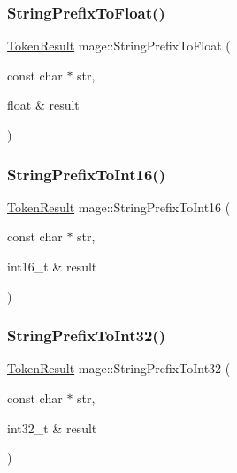 \hypertarget{namespacemage_a760872d7402dea494afc7e402c7b38da}{}\label{namespacemage_a760872d7402dea494afc7e402c7b38da} 
\subsubsection{\texorpdfstring{String\+Prefix\+To\+Float()}{StringPrefixToFloat()}}
{\footnotesize\ttfamily \hyperlink{namespacemage_a2178ba2411db5912f41b2e7698c2037d}{Token\+Result} mage\+::\+String\+Prefix\+To\+Float (\begin{DoxyParamCaption}\item[{const char $\ast$}]{str,  }\item[{float \&}]{result }\end{DoxyParamCaption})}

\hypertarget{namespacemage_a8ad9257753f5f5288f8e09b2c99e544e}{}\label{namespacemage_a8ad9257753f5f5288f8e09b2c99e544e} 
\subsubsection{\texorpdfstring{String\+Prefix\+To\+Int16()}{StringPrefixToInt16()}}
{\footnotesize\ttfamily \hyperlink{namespacemage_a2178ba2411db5912f41b2e7698c2037d}{Token\+Result} mage\+::\+String\+Prefix\+To\+Int16 (\begin{DoxyParamCaption}\item[{const char $\ast$}]{str,  }\item[{int16\+\_\+t \&}]{result }\end{DoxyParamCaption})}

\hypertarget{namespacemage_a6fbea19380a6886e4e84f45d86d3379f}{}\label{namespacemage_a6fbea19380a6886e4e84f45d86d3379f} 
\subsubsection{\texorpdfstring{String\+Prefix\+To\+Int32()}{StringPrefixToInt32()}}
{\footnotesize\ttfamily \hyperlink{namespacemage_a2178ba2411db5912f41b2e7698c2037d}{Token\+Result} mage\+::\+String\+Prefix\+To\+Int32 (\begin{DoxyParamCaption}\item[{const char $\ast$}]{str,  }\item[{int32\+\_\+t \&}]{result }\end{DoxyParamCaption})}

